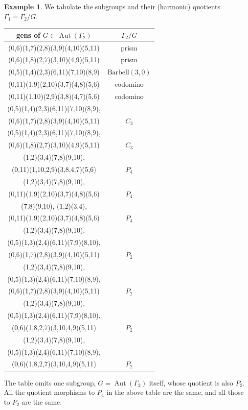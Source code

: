 \documentclass[12pt,letterpaper]{article}
\theoremstyle{definition}
\newtheorem{example}[theorem]{Example}
\DeclareMathOperator{\Aut}{Aut}
\begin{document}
\begin{example}
{We tabulate the subgroups and their (harmonic) quotients
$\Gamma_1=\Gamma_2/G$. 

{\small{
\begin{center}
\begin{tabular}{c|c}
  gens of $G\subset \Aut(\Gamma_2)$ & $\Gamma_2/G$ \\ \hline
  (0,6)(1,7)(2,8)(3,9)(4,10)(5,11) & prism \\ \hline
  (0,6)(1,8)(2,7)(3,10)(4,9)(5,11) & prism \\ \hline
  (0,5)(1,4)(2,3)(6,11)(7,10)(8,9) & $\mathrm{Barbell}(3,0)$ \\ \hline
  (0,11)(1,9)(2,10)(3,7)(4,8)(5,6) & codomino \\ \hline
  (0,11)(1,10)(2,9)(3,8)(4,7)(5,6) & codomino \\ \hline
  (0,5)(1,4)(2,3)(6,11)(7,10)(8,9), & \\
  (0,6)(1,7)(2,8)(3,9)(4,10)(5,11) & $C_3$ \\ \hline
  (0,5)(1,4)(2,3)(6,11)(7,10)(8,9), & \\
  (0,6)(1,8)(2,7)(3,10)(4,9)(5,11)  & $C_3$ \\ \hline
(1,2)(3,4)(7,8)(9,10), & \\
(0,11)(1,10,2,9)(3,8,4,7)(5,6)  & $P_4$ \\ \hline
  (1,2)(3,4)(7,8)(9,10), & \\
  (0,11)(1,9)(2,10)(3,7)(4,8)(5,6)  & $P_4$ \\ \hline
  (7,8)(9,10), (1,2)(3,4), & \\
  (0,11)(1,9)(2,10)(3,7)(4,8)(5,6)  & $P_4$ \\ \hline
  (1,2)(3,4)(7,8)(9,10),  & \\
  (0,5)(1,3)(2,4)(6,11)(7,9)(8,10), & \\
  (0,6)(1,7)(2,8)(3,9)(4,10)(5,11) & $P_2$ \\ \hline
  (1,2)(3,4)(7,8)(9,10), & \\
  (0,5)(1,3)(2,4)(6,11)(7,10)(8,9), & \\
  (0,6)(1,7)(2,8)(3,9)(4,10)(5,11) & $P_2$ \\ \hline
  (1,2)(3,4)(7,8)(9,10), & \\
  (0,5)(1,3)(2,4)(6,11)(7,9)(8,10), & \\
  (0,6)(1,8,2,7)(3,10,4,9)(5,11) & $P_2$ \\ \hline
  (1,2)(3,4)(7,8)(9,10), & \\
  (0,5)(1,3)(2,4)(6,11)(7,10)(8,9), & \\
  (0,6)(1,8,2,7)(3,10,4,9)(5,11) & $P_2$ \\
\end{tabular}
\end{center}
}}
The table omits one subgroup, $G=\Aut(\Gamma_2)$ itself, whose quotient is
also $P_2$. All the quotient morphisms to $P_4$ in the above table are the same,
and all those to $P_2$ are the same.

}
\end{example}
\end{document}
